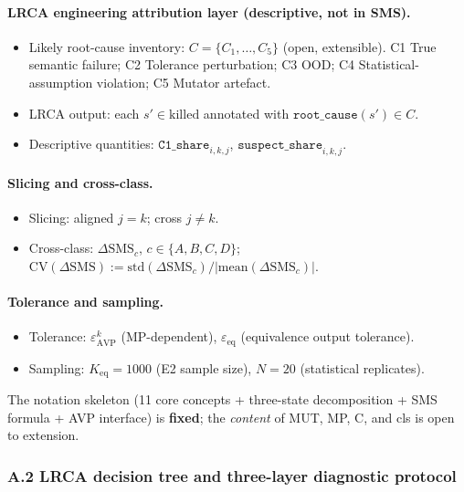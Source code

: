 \documentclass[review,12pt,authoryear]{elsarticle}
\begin{document}
\paragraph{LRCA engineering attribution layer (descriptive, not in SMS).}
\begin{itemize}
\item Likely root-cause inventory: $C = \{C_1, \ldots, C_5\}$ (open, extensible). C1 True semantic failure; C2 Tolerance perturbation; C3 OOD; C4 Statistical-assumption violation; C5 Mutator artefact.
\item LRCA output: each $s' \in \mathrm{killed}$ annotated with $\texttt{root\_cause}(s') \in C$.
\item Descriptive quantities: $\texttt{C1\_share}_{i,k,j}$, $\texttt{suspect\_share}_{i,k,j}$.
\end{itemize}

\paragraph{Slicing and cross-class.}
\begin{itemize}
\item Slicing: aligned $j = k$; cross $j \neq k$.
\item Cross-class: $\Delta\mathrm{SMS}_c$, $c \in \{A, B, C, D\}$; $\mathrm{CV}(\Delta\mathrm{SMS}) := \mathrm{std}(\Delta\mathrm{SMS}_c) / |\mathrm{mean}(\Delta\mathrm{SMS}_c)|$.
\end{itemize}

\paragraph{Tolerance and sampling.}
\begin{itemize}
\item Tolerance: $\varepsilon_{\mathrm{AVP}}^k$ (MP-dependent), $\varepsilon_{\mathrm{eq}}$ (equivalence output tolerance).
\item Sampling: $K_{\mathrm{eq}} = 1000$ (E2 sample size), $N = 20$ (statistical replicates).
\end{itemize}

The notation skeleton (11 core concepts + three-state decomposition +
SMS formula + AVP interface) is \textbf{fixed}; the \emph{content} of
MUT, MP, C, and cls is open to extension.

\subsubsection{A.2 LRCA decision tree and three-layer diagnostic protocol}\label{a.2-lrca-decision-tree-and-three-layer-diagnostic-protocol}
\end{document}
